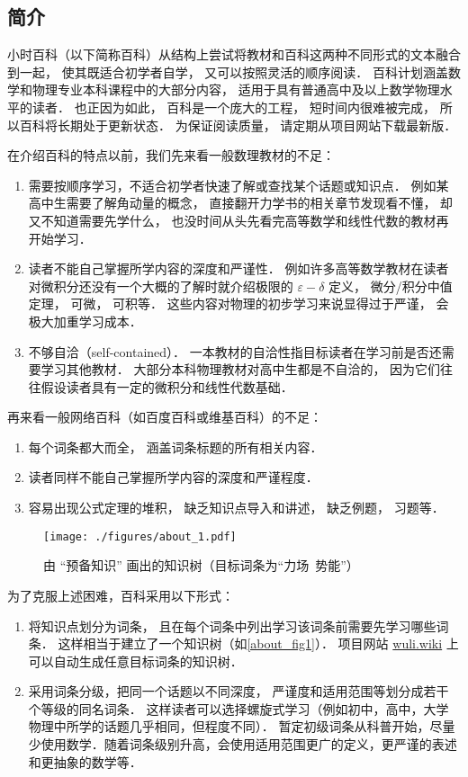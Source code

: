 
\subsection{简介}

小时百科（以下简称百科）从结构上尝试将教材和百科这两种不同形式的文本融合到一起， 使其既适合初学者自学， 又可以按照灵活的顺序阅读． 百科计划涵盖数学和物理专业本科课程中的大部分内容， 适用于具有普通高中及以上数学物理水平的读者． 也正因为如此， 百科是一个庞大的工程， 短时间内很难被完成， 所以百科将长期处于更新状态． 为保证阅读质量， 请定期从项目网站下载最新版．

在介绍百科的特点以前，我们先来看一般数理教材的不足：
\begin{enumerate}
\item 需要按顺序学习，不适合初学者快速了解或查找某个话题或知识点． 例如某高中生需要了解角动量的概念， 直接翻开力学书的相关章节发现看不懂， 却又不知道需要先学什么， 也没时间从头先看完高等数学和线性代数的教材再开始学习．
\item 读者不能自己掌握所学内容的深度和严谨性． 例如许多高等数学教材在读者对微积分还没有一个大概的了解时就介绍极限的 $\varepsilon-\delta$ 定义， 微分/积分中值定理， 可微， 可积等． 这些内容对物理的初步学习来说显得过于严谨， 会极大加重学习成本．
\item 不够自洽（self-contained）． 一本教材的自洽性指目标读者在学习前是否还需要学习其他教材． 大部分本科物理教材对高中生都是不自洽的， 因为它们往往假设读者具有一定的微积分和线性代数基础．
\end{enumerate}

再来看一般网络百科（如百度百科或维基百科）的不足：
\begin{enumerate}
\item 每个词条都大而全， 涵盖词条标题的所有相关内容．
\item 读者同样不能自己掌握所学内容的深度和严谨程度．
\item 容易出现公式定理的堆积， 缺乏知识点导入和讲述， 缺乏例题， 习题等．
\end{enumerate}

\begin{figure}[ht]
\centering
\texttt{[image: ./figures/about\_1.pdf]}
\caption{由 “预备知识” 画出的知识树（目标词条为“力场\ 势能”）}\label{about_fig1}
\end{figure}

为了克服上述困难，百科采用以下形式：
\begin{enumerate}
\item 将知识点划分为词条， 且在每个词条中列出学习该词条前需要先学习哪些词条． 这样相当于建立了一个知识树（如\autoref{about_fig1}）． 项目网站 \href{https://wuli.wiki}{wuli.wiki} 上可以自动生成任意目标词条的知识树．
\item 采用词条分级，把同一个话题以不同深度， 严谨度和适用范围等划分成若干个等级的同名词条． 这样读者可以选择螺旋式学习（例如初中，高中，大学物理中所学的话题几乎相同，但程度不同）． 暂定初级词条从科普开始，尽量少使用数学．随着词条级别升高，会使用适用范围更广的定义，更严谨的表述和更抽象的数学等．
\end{enumerate}

